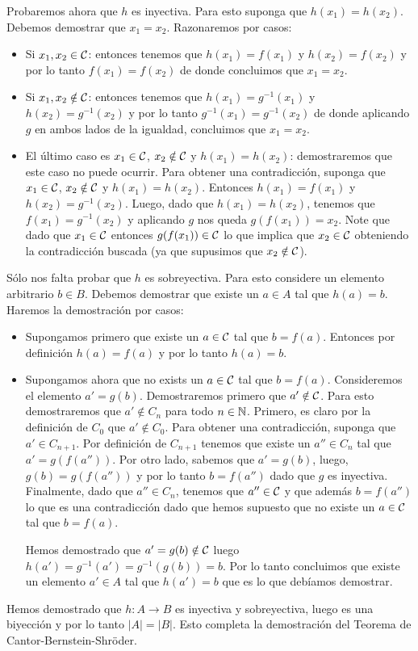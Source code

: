 Probaremos ahora que $h$ es inyectiva. Para esto suponga que $h(x_1)=h(x_2)$. 
Debemos demostrar que $x_1=x_2$. Razonaremos por casos:
\begin{itemize}
\item Si $x_1,x_2\in \mathcal{C}$: entonces tenemos que $h(x_1)=f(x_1)$ y $h(x_2)=f(x_2)$ y por lo tanto $f(x_1)=f(x_2)$
de donde concluimos que $x_1=x_2$.
\item Si $x_1,x_2\notin \mathcal{C}$: entonces tenemos que $h(x_1)=g^{-1}(x_1)$ y $h(x_2)=g^{-1}(x_2)$ 
y por lo tanto $g^{-1}(x_1)=g^{-1}(x_2)$ de donde aplicando $g$ en ambos lados de la igualdad,
concluimos que $x_1=x_2$.
\item El último caso es $x_1\in \mathcal{C}$, $x_2\notin\mathcal{C}$ y $h(x_1)=h(x_2)$:
demostraremos que este caso no puede ocurrir.
Para obtener una contradicción, suponga que $x_1\in \mathcal{C}$, $x_2\notin\mathcal{C}$ y $h(x_1)=h(x_2)$.
Entonces $h(x_1)=f(x_1)$ y $h(x_2)=g^{-1}(x_2)$. Luego, dado que $h(x_1)=h(x_2)$, tenemos que
$f(x_1)=g^{-1}(x_2)$ y aplicando $g$ nos queda $g(f(x_1))=x_2$.
Note que dado que $x_1\in \mathcal{C}$ entonces $g(f(x_1))\in \mathcal{C}$ lo que implica que $x_2\in \mathcal{C}$ obteniendo
la contradicción buscada (ya que supusimos que $x_2\notin \mathcal{C}$).
\end{itemize}

Sólo nos falta probar que $h$ es sobreyectiva. Para esto considere un elemento arbitrario $b\in B$.
Debemos demostrar que existe un $a\in A$ tal que $h(a)=b$.
Haremos la demostración por casos:
\begin{itemize}
\item Supongamos primero que existe un $a\in \mathcal{C}$ tal que $b=f(a)$. Entonces por definición
$h(a)=f(a)$ y por lo tanto $h(a)=b$.
\item Supongamos ahora que no exists un $a\in \mathcal{C}$ tal que $b=f(a)$. Consideremos el 
elemento $a'=g(b)$. Demostraremos primero que $a'\notin \mathcal{C}$. Para esto demostraremos que
$a'\notin C_n$ para todo $n\in \mathbb{N}$. Primero, es claro por la definición de $C_0$ que $a'\notin C_0$.
Para obtener una contradicción, suponga que $a'\in C_{n+1}$.
Por definición de $C_{n+1}$ tenemos que existe un $a''\in C_n$ tal que
$a'=g(f(a''))$. Por otro lado, sabemos que $a'=g(b)$, luego, $g(b)=g(f(a''))$ y por lo tanto
$b=f(a'')$ dado que $g$ es inyectiva. Finalmente, dado que $a''\in C_n$, tenemos que
$a''\in \mathcal{C}$ y que además $b=f(a'')$ lo que es una contradicción dado que hemos supuesto
que no existe un $a\in \mathcal{C}$ tal que $b=f(a)$.

Hemos demostrado que $a'=g(b)\notin \mathcal{C}$ luego $h(a')=g^{-1}(a')=g^{-1}(g(b))=b$. Por lo tanto
concluimos que existe un elemento $a'\in A$ tal que $h(a')=b$ que es lo que debíamos demostrar.
\end{itemize}

Hemos demostrado que $h:A\to B$ es inyectiva y sobreyectiva, luego es una biyección y por lo tanto
$|A|=|B|$.
Esto completa la demostración del Teorema de Cantor-Bernstein-Shr\"oder.







